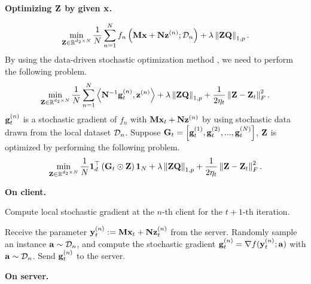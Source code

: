 \documentclass[journal]{IEEEtran}
\newcommand\algotext[1]{\end{algorithmic}#1\begin{algorithmic}[1]}
\begin{document}
\textbf{Optimizing ${\bf Z}$ by given ${\bf x}$.}

\begin{align}
\min_{\substack{{\bf Z}\in\mathbb{R}^{d_2\times N}}} \frac{1}{N}\sum_{n=1}^N f_n\left( {\bf M}{\bf x} + {\bf N} {\bf z}^{(n)}; \mathcal{D}_n \right) + \lambda \left\lVert{\bf Z}{\bf Q}\right\rVert_{1,p}.
\end{align}  By using the data-driven stochastic optimization method \cite{dd}, we need to perform the following problem.
\begin{align}
\nonumber
\min_{\substack{{\bf Z}\in\mathbb{R}^{d_2\times N}}} \frac{1}{N}\sum_{n=1}^N \left\langle{\bf N}^{-1} {\bf g}_t^{(n)}, {\bf z}^{(n)} \right\rangle + \lambda \left\lVert{\bf Z}{\bf Q}\right\rVert_{1,p} + \frac{1}{2\eta_t}\left\lVert{\bf Z} - {\bf Z}_t\right\rVert_F^2.
\end{align} ${\bf g}_t^{(n)}$ is a stochastic gradient of $f_n$ with ${\bf M}{\bf x}_t + {\bf N} {\bf z}^{(n)}$ by using stochastic data  drawn from the local dataset $\mathcal{D}_n$. Suppose ${\bf G}_t = \left [ {\bf g}_t^{(1)}, {\bf g}_t^{(2)}, ..., {\bf g}_t^{(N)} \right ]$, ${\bf Z}$ is optimized by performing the following problem.
\begin{align}
\nonumber
\min_{\substack{{\bf Z}\in\mathbb{R}^{d_2\times N}}} \frac{1}{N}{\bf 1}_d^\top\left( {\bf G}_t \odot {\bf Z} \right){\bf 1}_N + \lambda \left\lVert{\bf Z}{\bf Q}\right\rVert_{1,p} + \frac{1}{2\eta_t}\left\lVert{\bf Z} - {\bf Z}_t\right\rVert_F^2.
\end{align}

\textbf{On client.}  

\begin{algorithm}[!]
    \caption{Compute local stochastic gradient at the $n$-th client for the $t+1$-th iteration.}
    \label{algo_xxx}
    \begin{algorithmic}[1]
        \State Receive the parameter ${\bf y}_t^{(n)} := {\bf M}{\bf x}_t + {\bf N}{\bf z}_t^{(n)}$ from the server.
        \State Randomly sample an instance ${\bf a}\sim\mathcal{D}_n$, and compute the stochastic gradient ${\bf g}^{(n)}_t = \nabla f({\bf y}_t^{(n)};{\bf a})$ with ${\bf a}\sim\mathcal{D}_n$.
        \State Send ${\bf g}^{(n)}_t$ to the server.
    \end{algorithmic}
\end{algorithm} 





\textbf{On server.}
\end{document}
